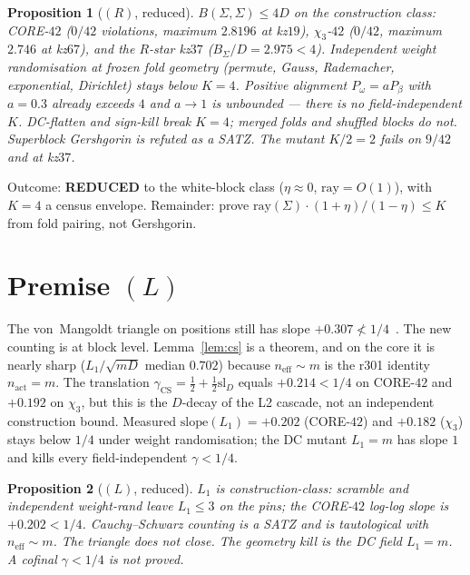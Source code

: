 \documentclass[11pt]{article}
\newtheorem{prop}{Proposition}
\theoremstyle{remark}
\begin{document}
\begin{prop}[$(R)$, reduced]\label{prop:R}
$B(\Sigma,\Sigma)\le 4 D$ on the construction class: CORE-$42$
($0/42$ violations, maximum $2.8196$ at kz$19$), $\chi_3$-$42$
($0/42$, maximum $2.746$ at kz$67$), and the $R$-star kz$37$
($B_\Sigma/D=2.975<4$).  Independent weight randomisation at
frozen fold geometry (permute, Gauss, Rademacher, exponential,
Dirichlet) stays below $K=4$.  Positive alignment
$P_\omega=a P_\beta$ with $a=0.3$ already exceeds $4$ and
$a\to 1$ is unbounded --- there is no field-independent $K$.
DC-flatten and sign-kill break $K=4$; merged folds and shuffled
blocks do \emph{not}.  Superblock Gershgorin is refuted as a
SATZ.  The mutant $K/2=2$ fails on $9/42$ and at kz$37$.
\end{prop}

\noindent
Outcome: \textbf{REDUCED} to the white-block class
($\eta\approx 0$, $\mathrm{ray}=O(1)$), with $K=4$ a census
envelope.  Remainder: prove
$\mathrm{ray}(\Sigma)\cdot(1+\eta)/(1-\eta)\le K$ from fold
pairing, not Gershgorin.

\section{Premise $(L)$}\label{sec:L}

The von~Mangoldt triangle on positions still has slope
$+0.307\not<1/4$~\cite{r383}.  The new counting is at block
level.  Lemma~\ref{lem:cs} is a theorem, and on the core it is
nearly sharp ($L_1/\sqrt{m D}$ median $0.702$) because
$n_{\mathrm{eff}}\sim m$ is the r301 identity $n_{\mathrm{act}}=m$.
The translation $\gamma_{\mathrm{CS}}=\tfrac12+\tfrac12\mathrm{sl}_D$
equals $+0.214<1/4$ on CORE-$42$ and $+0.192$ on $\chi_3$, but
this is the $D$-decay of the L2 cascade, not an independent
construction bound.  Measured $\mathrm{slope}(L_1)=+0.202$
(CORE-$42$) and $+0.182$ ($\chi_3$) stays below $1/4$ under
weight randomisation; the DC mutant $L_1=m$ has slope $1$ and
kills every field-independent $\gamma<1/4$.

\begin{prop}[$(L)$, reduced]\label{prop:L}
$L_1$ is construction-class: scramble and independent
weight-rand leave $L_1\le 3$ on the pins; the CORE-$42$
log-log slope is $+0.202<1/4$.  Cauchy--Schwarz counting is a
SATZ and is tautological with $n_{\mathrm{eff}}\sim m$.  The
triangle does not close.  The geometry kill is the DC field
$L_1=m$.  A cofinal $\gamma<1/4$ is not proved.
\end{prop}
\end{document}
